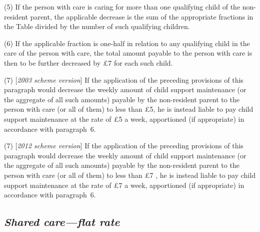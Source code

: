 \documentclass[12pt,a4paper]{article}
\begin{document}
\medskip

(5) If the person with care is caring for more than one qualifying child of the non-resident parent, the applicable decrease is the sum of the appropriate fractions in the Table divided by the number of such qualifying children.

(6) If the applicable fraction is one-half in relation to any qualifying child in the care of the person with care, the total amount payable to the person with care is then to be further decreased by £7 for each such child.

(7) [\emph{2003 scheme version}] If the application of the preceding provisions of this paragraph would decrease the weekly amount of child support maintenance (or the aggregate of all such amounts) payable by the non-resident parent to the person with care (or all of them) to less than £5, he is instead liable to pay child support maintenance at the rate of £5 a week, apportioned (if appropriate) in accordance with paragraph~6. 

(7) [\emph{2012 scheme version}] If the application of the preceding provisions of this paragraph would decrease the weekly amount of child support maintenance (or the aggregate of all such amounts) payable by the non-resident parent to the person with care (or all of them) to less than 
£7%
, he is instead liable to pay child support maintenance at the rate of 
£7  %
a week, apportioned (if appropriate) in accordance with paragraph~6. 


\subsection*{\itshape Shared care—flat rate}
\end{document}

